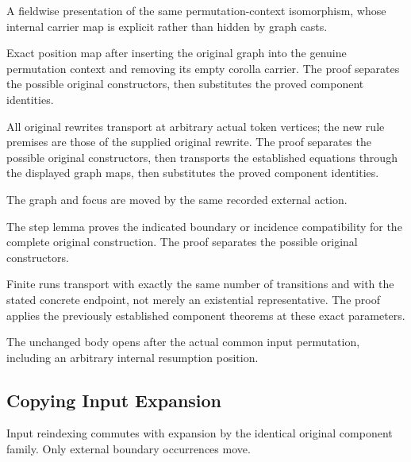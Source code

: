 A fieldwise presentation of the same permutation-context isomorphism,
whose internal carrier map is explicit rather than hidden by graph casts.
\par{}

Exact position map after inserting the original graph into the genuine
permutation context and removing its empty corolla carrier.
The proof separates the possible original constructors, then substitutes the proved component identities.
\par{}

All original rewrites transport at arbitrary actual token vertices;
the new rule premises are those of the supplied original rewrite.
The proof separates the possible original constructors, then transports the established equations through the displayed graph maps, then substitutes the proved component identities.
\par{}

The graph and focus are moved by the same recorded external action.
\par{}

The step lemma proves the indicated boundary or incidence compatibility for the complete original construction.
The proof separates the possible original constructors.
\par{}

Finite runs transport with exactly the same number of transitions and
with the stated concrete endpoint, not merely an existential representative.
The proof applies the previously established component theorems at these exact parameters.
\par{}

The unchanged body opens after the actual common input permutation,
including an arbitrary internal resumption position.
\par{}

\subsection{Copying Input Expansion}
Input reindexing commutes with expansion by the identical original
component family. Only external boundary occurrences move.

